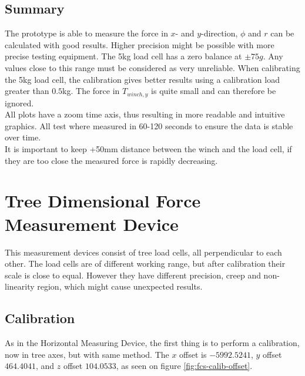 \newpage
\subsection{Summary}
The prototype is able to measure the force in $x$- and $y$-direction, $\phi$ and $r$ can be calculated with good results. Higher precision might be possible with more precise testing equipment.
The 5kg load cell has a zero balance at $\pm75g$. Any values close to this range must be considered as very unreliable. 
When calibrating the 5kg load cell, the calibration gives better results using a calibration load greater than $0.5$kg.
The force in $T_{winch,y}$ is quite small and can therefore be ignored.\\
All plots have a zoom time axis, thus resulting in more readable and intuitive graphics. All test where measured in 60-120 seconds to ensure the data is stable over time.\\
It is important to keep +50mm distance between the winch and the load cell, if they are too close the measured force is rapidly decreasing. 






\newpage
\section{Tree Dimensional Force Measurement Device}
This measurement devices consist of tree load cells, all perpendicular to each other. The load cells are of different working range, but after calibration their scale is close to equal. However they have different precision, creep and non-linearity region, which might cause unexpected results.

\subsection{Calibration}
As in the Horizontal Measuring Device, the first thing is to perform a calibration, now in tree axes, but with same method. The $x$ offset is $-5992.5241$, $y$ offset $464.4041$, and $z$ offset $104.0533$, as seen on figure \ref{fig:fcs-calib-offset}.\\

